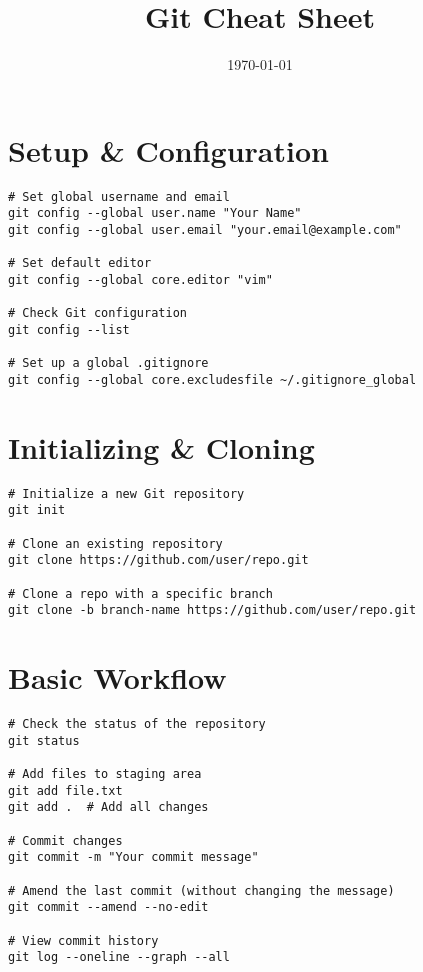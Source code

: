 \documentclass[11pt]{article}
\title{\textbf{Git Cheat Sheet}}
\author{}
\date{\today}
\begin{document}
    \maketitle

    \section*{Setup & Configuration}
    \begin{lstlisting}[style=gitStyle]
# Set global username and email
git config --global user.name "Your Name"
git config --global user.email "your.email@example.com"

# Set default editor
git config --global core.editor "vim"

# Check Git configuration
git config --list

# Set up a global .gitignore
git config --global core.excludesfile ~/.gitignore_global
    \end{lstlisting}

    \section*{Initializing & Cloning}
    \begin{lstlisting}[style=gitStyle]
# Initialize a new Git repository
git init

# Clone an existing repository
git clone https://github.com/user/repo.git

# Clone a repo with a specific branch
git clone -b branch-name https://github.com/user/repo.git
    \end{lstlisting}

    \section*{Basic Workflow}
    \begin{lstlisting}[style=gitStyle]
# Check the status of the repository
git status

# Add files to staging area
git add file.txt
git add .  # Add all changes

# Commit changes
git commit -m "Your commit message"

# Amend the last commit (without changing the message)
git commit --amend --no-edit

# View commit history
git log --oneline --graph --all
    \end{lstlisting}
\end{document}
